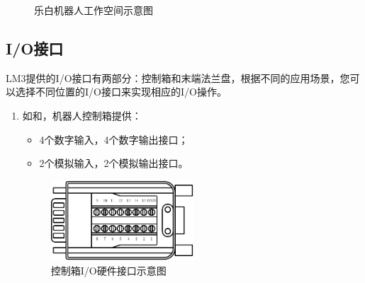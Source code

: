 \begin{figure}[ht]
{\begin{minipage}[b]{0.45\textwidth}
    	\end{minipage}
    }
    \caption{乐白机器人工作空间示意图}
    \label{fig:机器人运动范围}
\end{figure}



\subsection{I/O接口}

LM3提供的I/O接口有两部分：控制箱和末端法兰盘，根据不同的应用场景，您可以选择不同位置的I/O接口来实现相应的I/O操作。

\begin{enumerate}
    \item 如和，机器人控制箱提供：
    \begin{itemize}
        \item 4个数字输入，4个数字输出接口；
        \item 2个模拟输入，2个模拟输出接口。
    \end{itemize}

\begin{figure}[ht]
    \centering
    \includegraphics[height=3cm]{line_graphs/robot_box_io_plugin.pdf}
    \caption{控制箱I/O硬件接口示意图}
    \label{fig:控制箱IO}
\end{figure}


\end{enumerate}
